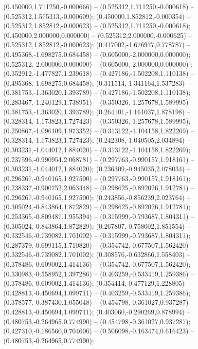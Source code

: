  (0.450000,1.711250,-0.000666) -- (0.525312,1.711250,-0.000618) -- (0.525312,1.575313,-0.000609);
 (0.450000,1.852812,-0.000354) -- (0.525312,1.852812,-0.000623) -- (0.525312,1.711250,-0.000618);
 (0.450000,2.000000,0.000000) -- (0.525312,2.000000,-0.000625) -- (0.525312,1.852812,-0.000623);
 (0.417002,-1.676977,0.778787) -- (0.495368,-1.698275,0.684458) -- (0.605000,-2.000000,0.000000);
 (0.525312,-2.000000,0.000000) -- (0.605000,-2.000000,0.000000) ;
 (0.352912,-1.477827,1.239618) -- (0.427186,-1.502208,1.110138) -- (0.495368,-1.698275,0.684458);
 (0.311514,-1.341164,1.537283) -- (0.381753,-1.363020,1.393789) -- (0.427186,-1.502208,1.110138);
 (0.283467,-1.240129,1.738951) -- (0.350326,-1.257678,1.589995) -- (0.381753,-1.363020,1.393789);
 (0.264101,-1.161037,1.878198) -- (0.328314,-1.173823,1.727423) -- (0.350326,-1.257678,1.589995);
 (0.250867,-1.096109,1.973352) -- (0.313122,-1.104158,1.822269) -- (0.328314,-1.173823,1.727423);
 (0.242308,-1.040505,2.034894) -- (0.303231,-1.044012,1.884020) -- (0.313122,-1.104158,1.822269);
 (0.237596,-0.990954,2.068781) -- (0.297763,-0.990157,1.918161) -- (0.303231,-1.044012,1.884020);
 (0.236309,-0.945035,2.078034) -- (0.296267,-0.940165,1.927500) -- (0.297763,-0.990157,1.918161);
 (0.238337,-0.900752,2.063448) -- (0.298625,-0.892026,1.912781) -- (0.296267,-0.940165,1.927500);
 (0.243856,-0.856239,2.023764) -- (0.305024,-0.843864,1.872829) -- (0.298625,-0.892026,1.912781);
 (0.253365,-0.809487,1.955394) -- (0.315999,-0.793687,1.804311) -- (0.305024,-0.843864,1.872829);
 (0.267807,-0.758002,1.851554) -- (0.332546,-0.739082,1.701002) -- (0.315999,-0.793687,1.804311);
 (0.287379,-0.699115,1.710820) -- (0.354742,-0.677507,1.562420) -- (0.332546,-0.739082,1.701002);
 (0.308576,-0.632866,1.558403) -- (0.378486,-0.609002,1.414136) -- (0.354742,-0.677507,1.562420);
 (0.330983,-0.558952,1.397286) -- (0.403259,-0.533419,1.259386) -- (0.378486,-0.609002,1.414136);
 (0.354414,-0.477129,1.228805) -- (0.428813,-0.450694,1.099711) -- (0.403259,-0.533419,1.259386);
 (0.378577,-0.387430,1.055048) -- (0.454798,-0.361027,0.937287) -- (0.428813,-0.450694,1.099711);
 (0.403060,-0.290269,0.878994) -- (0.480753,-0.264965,0.774990) -- (0.454798,-0.361027,0.937287);
 (0.427310,-0.186560,0.704606) -- (0.506098,-0.163474,0.616423) -- (0.480753,-0.264965,0.774990);
